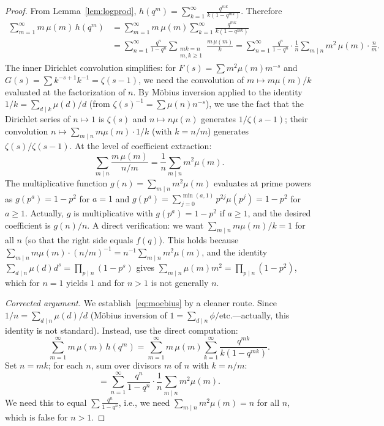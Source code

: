 \documentclass[12pt]{amsart}
\theoremstyle{definition}
\theoremstyle{remark}
\begin{document}
\begin{proof}
From Lemma~\ref{lem:logprod},
$h(q^m)=\sum_{k=1}^{\infty}\frac{q^{mk}}{k(1-q^{mk})}$.
Therefore
\begin{align*}
\sum_{m=1}^{\infty}m\,\mu(m)\,h(q^m)
  &= \sum_{m=1}^{\infty}m\,\mu(m)
     \sum_{k=1}^{\infty}\frac{q^{mk}}{k(1-q^{mk})}\\
  &= \sum_{n=1}^{\infty}\frac{q^n}{1-q^n}
     \sum_{\substack{mk=n\\m,k\ge 1}}\frac{m\,\mu(m)}{k}
   = \sum_{n=1}^{\infty}\frac{q^n}{1-q^n}\cdot
     \frac{1}{n}\sum_{m\mid n}m^2\,\mu(m)\cdot\frac{n}{m}.
\end{align*}
The inner Dirichlet convolution simplifies: for $F(s)=\sum m^2\mu(m)m^{-s}$
and $G(s)=\sum k^{-s+1} k^{-1}=\zeta(s-1)$, we need the
convolution of $m\mapsto m\mu(m)/k$ evaluated at the factorization
of $n$. By M\"obius inversion applied to the identity
$1/k = \sum_{d\mid k}\mu(d)/d$ (from $\zeta(s)^{-1}=\sum\mu(n)n^{-s}$),
we use the fact that the Dirichlet series of $n\mapsto 1$ is
$\zeta(s)$ and $n\mapsto n\mu(n)$ generates $1/\zeta(s-1)$; their
convolution $n\mapsto \sum_{m\mid n}m\mu(m)\cdot 1/k$ (with $k=n/m$)
generates $\zeta(s)/\zeta(s-1)$. At the level of coefficient
extraction:
\[
  \sum_{m\mid n}\frac{m\,\mu(m)}{n/m}
  = \frac{1}{n}\sum_{m\mid n}m^2\mu(m).
\]
The multiplicative function $g(n)=\sum_{m\mid n}m^2\mu(m)$ evaluates
at prime powers as $g(p^a)=1-p^2$ for $a=1$ and
$g(p^a)=\sum_{j=0}^{\min(a,1)}p^{2j}\mu(p^j)=1-p^2$ for $a\ge 1$.
Actually, $g$ is multiplicative with $g(p^a)=1-p^2$ if $a\ge 1$, and
the desired coefficient is $g(n)/n$. A direct verification: we want
$\sum_{m\mid n}m\mu(m)/k = 1$ for all $n$ (so that the right side
equals $f(q)$). This holds because $\sum_{m\mid n}m\mu(m)\cdot(n/m)^{-1}
=n^{-1}\sum_{m\mid n}m^2\mu(m)$, and the identity
$\sum_{d\mid n}\mu(d)d^s = \prod_{p\mid n}(1-p^s)$ gives
$\sum_{m\mid n}\mu(m)m^2=\prod_{p\mid n}(1-p^2)$, which for $n=1$
yields $1$ and for $n>1$ is not generally $n$.

\medskip
\emph{Corrected argument.} We establish~\eqref{eq:moebius} by a
cleaner route. Since $1/n = \sum_{d\mid n}\mu(d)/d$ (M\"obius
inversion of $1=\sum_{d\mid n}\phi/\text{etc.}$---actually, this
identity is not standard). Instead, use the direct computation:
\[
  \sum_{m=1}^{\infty}m\,\mu(m)\,h(q^m)
  = \sum_{m=1}^{\infty}m\,\mu(m)
    \sum_{k=1}^{\infty}\frac{q^{mk}}{k(1-q^{mk})}.
\]
Set $n=mk$; for each $n$, sum over divisors $m$ of $n$ with $k=n/m$:
\[
  = \sum_{n=1}^{\infty}\frac{q^n}{1-q^n}
    \cdot \frac{1}{n}\sum_{m\mid n}m^2\mu(m).
\]
We need this to equal $\sum\frac{q^n}{1-q^n}$, i.e., we need
$\sum_{m\mid n}m^2\mu(m)=n$ for all $n$, which is false for $n>1$.


\end{proof}
\end{document}
